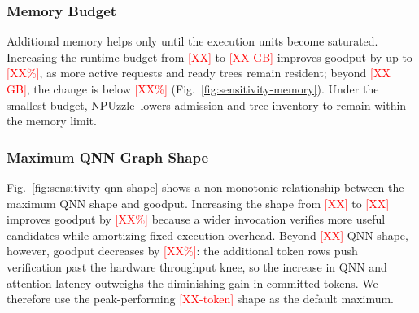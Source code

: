 \documentclass[sigconf,nonacm,10pt]{acmart}
\newcommand{\name}{NPUzzle\xspace}
\begin{document}
{{\subsubsection{Memory Budget}
Additional memory helps only until the execution units become saturated.
Increasing the runtime budget from \textcolor{red}{[XX]} to
\textcolor{red}{[XX GB]} improves goodput by up to \textcolor{red}{[XX\%]}, as
more active requests and ready trees remain resident; beyond
\textcolor{red}{[XX GB]}, the change is below \textcolor{red}{[XX\%]}
(Fig.~\ref{fig:sensitivity-memory}). Under the smallest budget, \name\ lowers
admission and tree inventory to remain within the memory limit.

\subsubsection{Maximum QNN Graph Shape}
Fig.~\ref{fig:sensitivity-qnn-shape} shows a non-monotonic relationship
between the maximum QNN shape and goodput. Increasing the shape from
\textcolor{red}{[XX]} to \textcolor{red}{[XX]} improves goodput by
\textcolor{red}{[XX\%]} because a wider invocation verifies more useful
candidates while amortizing fixed execution overhead. Beyond
\textcolor{red}{[XX]} QNN shape, however, goodput decreases by
\textcolor{red}{[XX\%]}: the additional token rows push verification past the
hardware throughput knee, so the increase in QNN and attention latency
outweighs the diminishing gain in committed tokens. We therefore use the
peak-performing \textcolor{red}{[XX-token]} shape as the default maximum.

}}
\end{document}

